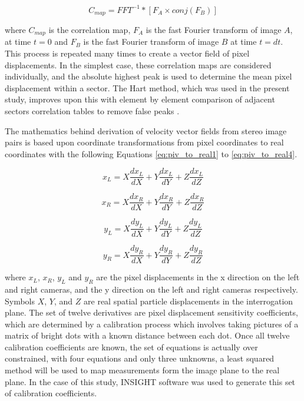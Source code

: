 \begin{equation}
C_{map} = FFT^{-1} * [F_A \times conj(F_B) ]
\label{eq:correlation_map}
\end{equation}

where $C_{map}$ is the correlation map, $F_A$ is the fast Fourier transform of 
image $A$, at time $t=0$ and $F_B$ is the fast Fourier transform of image $B$ 
at time $t=dt$. This process is repeated many times to create a vector field of 
pixel displacements. In the simplest case, these correlation maps are 
considered individually, and the absolute highest peak is used to determine the 
mean pixel displacement within a sector. The Hart method, which was used in the 
present study, improves upon this with element by element comparison of 
adjacent sectors correlation tables to remove false peaks 
\cite{hart1998,hart1999}.

The mathematics behind derivation of velocity vector fields from stereo image 
pairs is based upon coordinate transformations from pixel coordinates to real 
coordinates with the following Equations 
\ref{eq:piv_to_real1} to \ref{eq:piv_to_real4}.

\begin{equation}
x_L= X\frac{dx_L}{dX} + Y\frac{dx_L}{dY} + Z\frac{dx_L}{dZ}
\label{eq:piv_to_real1}
\end{equation}

\begin{equation}
x_R= X\frac{dx_R}{dX} + Y\frac{dx_R}{dY} + Z\frac{dx_R}{dZ}
\label{eq:piv_to_real2}
\end{equation}

\begin{equation}
y_L= X\frac{dy_L}{dX} + Y\frac{dy_L}{dY} + Z\frac{dy_L}{dZ}
\label{eq:piv_to_real3}
\end{equation}

\begin{equation}
y_R= X\frac{dy_R}{dX} + Y\frac{dy_R}{dY} + Z\frac{dy_R}{dZ}
\label{eq:piv_to_real4}
\end{equation}

where $x_L$, $x_R$, $y_L$ and $y_R$ are the pixel displacements in the x 
direction on the left and right cameras, and the y direction on the left and 
right cameras respectively. Symbols $X$, $Y$, and $Z$ are real spatial particle 
displacements in the interrogation plane. The set of twelve derivatives are 
pixel displacement sensitivity coefficients, which are determined by a 
calibration process which involves taking pictures of a matrix of bright dots 
with a known distance between each dot. Once all twelve calibration 
coefficients are known, the set of equations is actually over constrained, with 
four equations and only three unknowns, a least squared method will be used to 
map measurements form the image plane to the real plane. In the case of this 
study, INSIGHT software was used to generate this set of calibration 
coefficients.

